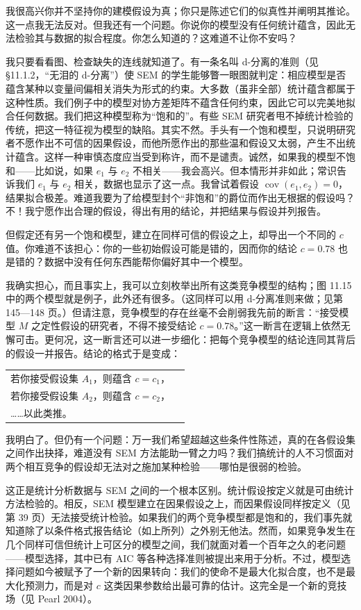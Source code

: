 我很高兴你并不坚持你的建模假设为真；你只是陈述它们的似真性并阐明其推论。这一点我无法反对。但我还有一个问题。你说你的模型没有任何统计蕴含，因此无法检验其与数据的拟合程度。你怎么知道的？这难道不让你不安吗？

我只要看看图、检查缺失的连线就知道了。有一条名叫 d-分离的准则（见 \S11.1.2，“无泪的 d-分离”）使 SEM 的学生能够瞥一眼图就判定：相应模型是否蕴含某种以变量间偏相关消失为形式的约束。大多数（虽非全部）统计蕴含都属于这种性质。我们例子中的模型对协方差矩阵不蕴含任何约束，因此它可以完美地拟合任何数据。我们把这种模型称为“饱和的”。有些 SEM 研究者甩不掉统计检验的传统，把这一特征视为模型的缺陷。其实不然。手头有一个饱和模型，只说明研究者不愿作出不可信的因果假设，而他所愿作出的那些温和假设又太弱，产生不出统计蕴含。这样一种审慎态度应当受到称许，而不是谴责。诚然，如果我的模型不饱和——比如说，如果 $e_1$ 与 $e_2$ 不相关——我会高兴。但本情形并非如此；常识告诉我们 $e_1$ 与 $e_2$ 相关，数据也显示了这一点。我曾试着假设 $\operatorname{cov}(e_1,e_2)=0$，结果拟合极差。难道我要为了给模型封个“非饱和”的爵位而作出无根据的假设吗？不！我宁愿作出合理的假设，得出有用的结论，并把结果与假设并列报告。

但假定还有另一个饱和模型，建立在同样可信的假设之上，却导出一个不同的 $c$ 值。你难道不该担心：你的一些初始假设可能是错的，因而你的结论 $c=0.78$ 也是错的？数据中没有任何东西能帮你偏好其中一个模型。

我确实担心，而且事实上，我可以立刻枚举出所有这类竞争模型的结构；图 11.15 中的两个模型就是例子，此外还有很多。（这同样可以用 d-分离准则来做；见第 145—148 页。）但请注意，竞争模型的存在丝毫不会削弱我先前的断言：“接受模型 $M$ 之定性假设的研究者，不得不接受结论 $c=0.78$。”这一断言在逻辑上依然无懈可击。更何况，这一断言还可以进一步细化：把每个竞争模型的结论连同其背后的假设一并报告。结论的格式于是变成：

\begin{center}
\begin{tabular}{ll}
若你接受假设集 $A_1$，则蕴含 $c=c_1$，\\
若你接受假设集 $A_2$，则蕴含 $c=c_2$，\\
……以此类推。
\end{tabular}
\end{center}

我明白了。但仍有一个问题：万一我们希望超越这些条件性陈述，真的在各假设集之间作出抉择，难道没有 SEM 方法能助一臂之力吗？我们搞统计的人不习惯面对两个相互竞争的假设却无法对之施加某种检验——哪怕是很弱的检验。

这正是统计分析数据与 SEM 之间的一个根本区别。统计假设按定义就是可由统计方法检验的。相反，SEM 模型建立在因果假设之上，而因果假设同样按定义（见第 39 页）无法接受统计检验。如果我们的两个竞争模型都是饱和的，我们事先就知道除了以条件格式报告结论（如上所列）之外别无他法。然而，如果竞争发生在几个同样可信但统计上可区分的模型之间，我们就面对着一个百年之久的老问题——模型选择，其中已有 AIC 等各种选择准则被提出来用于分析。不过，模型选择问题如今被赋予了一个新的因果转向：我们的使命不是最大化拟合度，也不是最大化预测力，而是对 $c$ 这类因果参数给出最可靠的估计。这完全是一个新的竞技场（见 Pearl 2004）。

